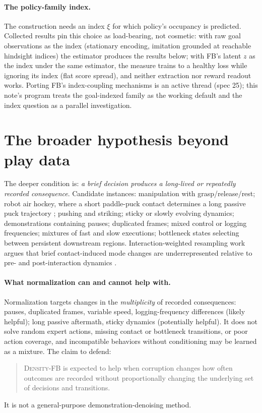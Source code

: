 \documentclass{article}
\newcommand{\DensityFB}{\textsc{Density-FB}}
\begin{document}
\paragraph{The policy-family index.}
The construction needs an index $\xi$ for which policy's occupancy is predicted.
Collected results pin this choice as load-bearing, not cosmetic: with raw goal observations as the index (stationary encoding, imitation grounded at reachable hindsight indices) the estimator produces the results below; with FB's latent $z$ as the index under the same estimator, the measure trains to a healthy loss while ignoring its index (flat score spread), and neither extraction nor reward readout works.
Porting FB's index-coupling mechanisms is an active thread (spec 25); this note's program treats the goal-indexed family as the working default and the index question as a parallel investigation.

\section{The broader hypothesis beyond play data}
\label{sec:beyond}

The deeper condition is: \emph{a brief decision produces a long-lived or repeatedly recorded consequence}.
Candidate instances: manipulation with grasp/release/rest; robot air hockey, where a short paddle-puck contact determines a long passive puck trajectory \citep{chuck2024airhockey}; pushing and striking; sticky or slowly evolving dynamics; demonstrations containing pauses; duplicated frames; mixed control or logging frequencies; mixtures of fast and slow executions; bottleneck states selecting between persistent downstream regions.
Interaction-weighted resampling work argues that brief contact-induced mode changes are underrepresented relative to pre- and post-interaction dynamics \citep{shen2026interaction}.

\paragraph{What normalization can and cannot help with.}
Normalization targets changes in the \emph{multiplicity} of recorded consequences: pauses, duplicated frames, variable speed, logging-frequency differences (likely helpful); long passive aftermath, sticky dynamics (potentially helpful).
It does not solve random expert actions, missing contact or bottleneck transitions, or poor action coverage, and incompatible behaviors without conditioning may be learned as a mixture.
The claim to defend:
\begin{quote}
\DensityFB{} is expected to help when corruption changes how often outcomes are recorded without proportionally changing the underlying set of decisions and transitions.
\end{quote}
It is not a general-purpose demonstration-denoising method.
\end{document}
